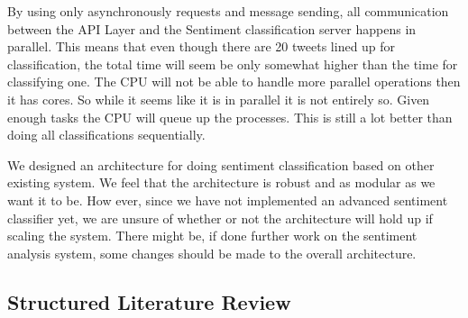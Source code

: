 By using only asynchronously requests and message sending, all communication between the API Layer and the Sentiment classification server happens in parallel. This means that even though there are 20 tweets lined up for classification, the total time will seem be only somewhat higher than the time for classifying one. The CPU will not be able to handle more parallel operations then it has cores. So while it seems like it is in parallel it is not entirely so. Given enough tasks the CPU will queue up the processes. This is still a lot better than doing all classifications sequentially. 

We designed an architecture for doing sentiment classification based on other existing system. We feel that the architecture is robust and as modular as we want it to be. How ever, since we have not implemented an advanced sentiment classifier yet, we are unsure of whether or not the architecture will hold up if scaling the system. There might be, if done further work on the sentiment analysis system, some changes should be made to the overall architecture. 


\subsection{Structured Literature Review}
